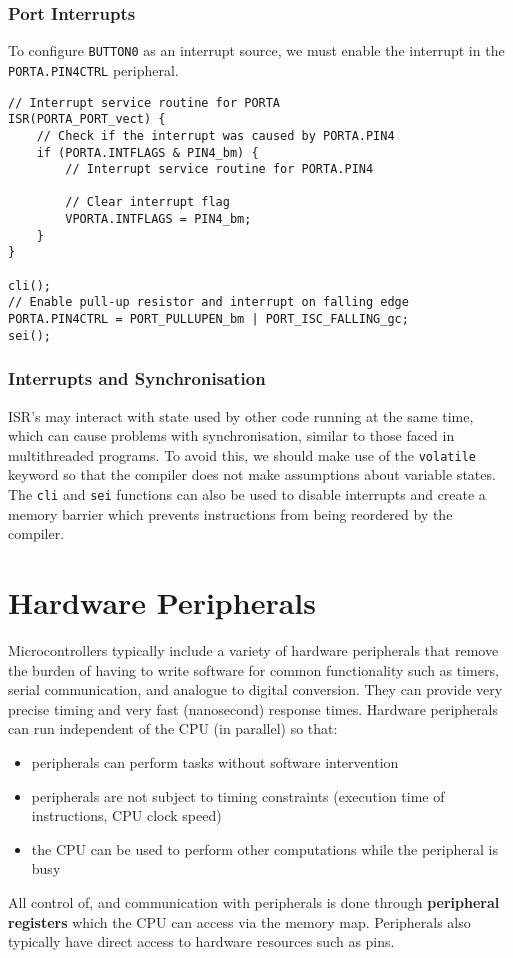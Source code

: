 \documentclass{article}
\begin{document}
\subsubsection{Port Interrupts}
To configure \texttt{BUTTON0} as an interrupt source, we must
enable the interrupt in the \texttt{PORTA.PIN4CTRL} peripheral.
\begin{verbatim}
// Interrupt service routine for PORTA
ISR(PORTA_PORT_vect) {
    // Check if the interrupt was caused by PORTA.PIN4
    if (PORTA.INTFLAGS & PIN4_bm) {
        // Interrupt service routine for PORTA.PIN4

        // Clear interrupt flag
        VPORTA.INTFLAGS = PIN4_bm;
    }
}

cli();
// Enable pull-up resistor and interrupt on falling edge
PORTA.PIN4CTRL = PORT_PULLUPEN_bm | PORT_ISC_FALLING_gc;
sei();
\end{verbatim}
\subsubsection{Interrupts and Synchronisation}
ISR's may interact with state used by other code running at the same
time, which can cause problems with synchronisation, similar to those
faced in multithreaded programs. To avoid this, we should make use of
the \texttt{volatile} keyword so that the compiler does not make
assumptions about variable states. The \texttt{cli} and
\texttt{sei} functions can also be used to disable interrupts
and create a memory barrier which prevents instructions from being
reordered by the compiler.
\section{Hardware Peripherals}
Microcontrollers typically include a variety of hardware peripherals
that remove the burden of having to write software for common
functionality such as timers, serial communication, and analogue to
digital conversion. They can provide very precise timing and very fast
(nanosecond) response times. Hardware peripherals can run independent
of the CPU (in parallel) so that:
\begin{itemize}
    \item peripherals can perform tasks without software intervention
    \item peripherals are not subject to timing constraints (execution
          time of instructions, CPU clock speed)
    \item the CPU can be used to perform other computations while the
          peripheral is busy
\end{itemize}
All control of, and communication with peripherals is done through
\textbf{peripheral registers} which the CPU can access via the memory
map. Peripherals also typically have direct access to hardware resources
such as pins.
\end{document}
